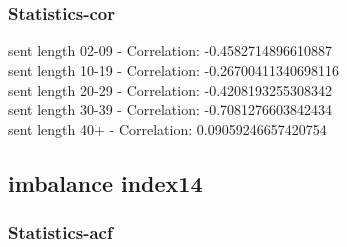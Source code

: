 \documentclass{article}%
\begin{document}
\begin{figure}[ht]%
\centering%
\setlength{\abovecaptionskip}{-35pt}%
%
%
\\%
%
%
\\%
%
\end{figure}

%
\newpage%
\subsubsection{Statistics{-}cor}%
\label{ssubsec:Statistics{-}cor}%
\noindent%
sent length 02-09 - Correlation: -0.4582714896610887\\%
sent length 10-19 - Correlation: -0.26700411340698116\\%
sent length 20-29 - Correlation: -0.4208193255308342\\%
sent length 30-39 - Correlation: -0.7081276603842434\\%
sent length 40+ - Correlation: 0.09059246657420754\\

%
\newpage

%
\subsection{imbalance index14}%
\label{subsec:imbalanceindex14}%
\subsubsection{Statistics{-}acf}%
\label{ssubsec:Statistics{-}acf}%
\end{document}
